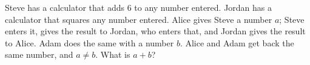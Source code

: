 Steve has a calculator that adds $6$ to any number entered. Jordan has a calculator that squares any number entered. Alice gives Steve a number $a$; Steve enters it, gives the result to Jordan, who enters that, and Jordan gives the result to Alice. Adam does the same with a number $b$. Alice and Adam get back the same number, and $a\ne b$. What is $a+b$?
